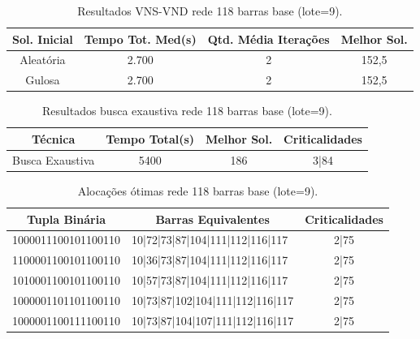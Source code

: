 \documentclass[12pt]{article}
\begin{document}
\begin{table}[H]
	\centering
	\caption{Resultados VNS-VND rede 118 barras base (lote=9).}
	\begin{tabular}{|c|c|c|c|}
		\hline
		\textbf{Sol. Inicial} & \textbf{Tempo Tot. Med(s)} & \textbf{Qtd. Média Iterações} & \textbf{Melhor Sol. } \\
		\hline
		Aleatória & 2.700 & 2     & 152,5 \\
		\hline
		Gulosa & 2.700 & 2     & 152,5 \\
		\hline
	\end{tabular}%
	\label{tab19}%
\end{table}%

\begin{table}[H]
	\centering
	\caption{Resultados busca exaustiva rede 118 barras base (lote=9).}
	\begin{tabular}{|c|c|c|c|}
		\hline
		\textbf{Técnica} & \textbf{Tempo Total(s)} & \textbf{Melhor Sol.} & \textbf{Criticalidades} \\
		\hline
		Busca Exaustiva & 5400  & 186   & 3|84 \\
		\hline
	\end{tabular}%
	\label{tab20}%
\end{table}%

\begin{table}[H]
	\centering
	\caption{Alocações ótimas rede 118 barras base (lote=9).}
	\begin{tabular}{|l|l|c|}
		\hline
		\multicolumn{1}{|c|}{\textbf{Tupla Binária}} & \multicolumn{1}{c|}{\textbf{Barras Equivalentes}} & \multicolumn{1}{l|}{\textbf{Criticalidades}} \\
		\hline
		1000011100101100110 & 10|72|73|87|104|111|112|116|117 & 2|75 \\
		\hline
		1100001100101100110 & 10|36|73|87|104|111|112|116|117 & 2|75 \\
		\hline
		1010001100101100110 & 10|57|73|87|104|111|112|116|117 & 2|75 \\
		\hline
		1000001101101100110 & 10|73|87|102|104|111|112|116|117 & 2|75 \\
		\hline
		1000001100111100110 & 10|73|87|104|107|111|112|116|117 & 2|75 \\
		\hline
	\end{tabular}%
	\label{tab21}%
\end{table}%
\end{document}
